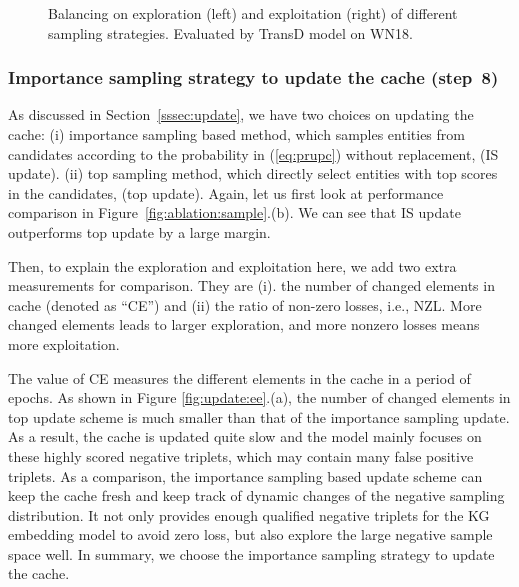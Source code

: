 \documentclass[conference]{IEEEtran}
\begin{document}
\begin{figure}[ht]

\caption{Balancing on exploration (left) and exploitation (right) of different sampling strategies. Evaluated by TransD model on WN18.}
\label{fig:sampleee}
\end{figure}







\subsubsection{Importance sampling strategy to update the cache (step~8)}

As discussed in Section~\ref{sssec:update},
we have two choices on updating the cache:
(i) importance sampling based method, which samples  entities from  candidates according to the probability in (\ref{eq:prupc}) without replacement, (IS update).
(ii) top sampling method, which directly select  entities with top scores in the candidates, (top update).
Again,
let us first look at performance comparison in 
Figure~\ref{fig:ablation:sample}.(b).
We can see that IS update outperforms top update by a large margin.



Then,
to explain the exploration and exploitation here,
we add two extra measurements for comparison.
They are (i). the number of changed elements in cache (denoted as ``CE'')
and (ii) the ratio of non-zero losses, i.e., NZL.
More changed elements leads to larger exploration, 
and more nonzero losses means more exploitation.


The value of CE measures the different elements in the cache in a period of epochs. 
As shown in Figure \ref{fig:update:ee}.(a), 
the number of changed elements in top update scheme is much smaller than that of the importance sampling update. 
As a result, the cache is updated quite slow and the model mainly focuses on these highly scored negative triplets,
 which may contain many false positive triplets.
 As a comparison, the importance sampling based update scheme can keep the cache fresh and keep track of dynamic changes of the negative sampling distribution. 
 It not only provides enough qualified negative triplets for the KG embedding model to avoid zero loss, 
 but also explore the large negative sample space well. In summary, we choose the importance sampling strategy to update the cache.
 
\end{document}

